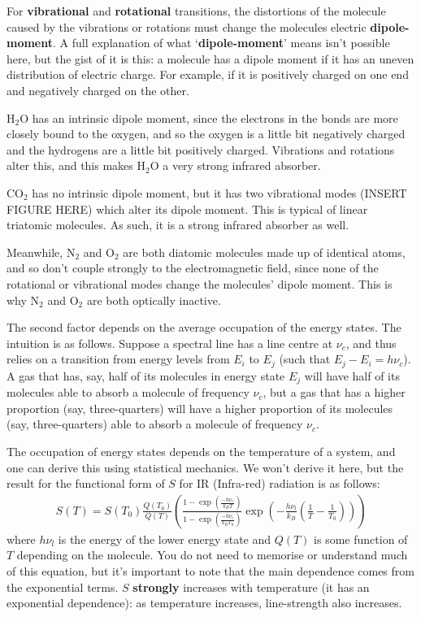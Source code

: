For \textbf{vibrational} and \textbf{rotational} transitions, the distortions of the molecule caused by the vibrations or rotations must change the molecules electric \textbf{dipole-moment}. A full explanation of what `\textbf{dipole-moment}' means isn't possible here, but the gist of it is this: a molecule has a dipole moment if it has an uneven distribution of electric charge. For example, if it is positively charged on one end and negatively charged on the other.

H$_2$O has an intrinsic dipole moment, since the electrons in the bonds are more closely bound to the oxygen, and so the oxygen is a little bit negatively charged and the hydrogens are a little bit positively charged. Vibrations and rotations alter this, and this makes H$_2$O a very strong infrared absorber.

CO$_2$ has no intrinsic dipole moment, but it has two vibrational modes (INSERT FIGURE HERE) which alter its dipole moment. This is typical of linear triatomic molecules. As such, it is a strong infrared absorber as well.

Meanwhile, N$_2$ and O$_2$ are both diatomic molecules made up of identical atoms, and so don't couple strongly to the electromagnetic field, since none of the rotational or vibrational modes change the molecules' dipole moment. This is why N$_2$ and O$_2$ are both optically inactive.

The second factor depends on the average occupation of the energy states. The intuition is as follows. Suppose a spectral line has a line centre at $\nu_c$, and thus relies on a transition from energy levels from $E_i$ to $E_j$ (such that $E_j-E_i=h\nu_c$). A gas that has, say, half of its molecules in energy state $E_j$ will have half of its molecules able to absorb a molecule of frequency $\nu_c$, but a gas that has a higher proportion (say, three-quarters) will have a higher proportion of its molecules (say, three-quarters) able to absorb a molecule of frequency $\nu_c$.

The occupation of energy states depends on the temperature of a system, and one can derive this using statistical mechanics. We won't derive it here, but the result for the functional form of $S$ for IR (Infra-red) radiation is as follows:
\begin{align*}
    S(T)=S(T_0)\frac{Q(T_0)}{Q(T)}\left( 
        \frac{1-\exp\left( \frac{-h\nu_c}{k_BT} \right)}{1-\exp\left( \frac{-h\nu_c}{k_BT_0} \right)}\exp\left( 
            -\frac{h\nu_l}{k_B}\left( \frac{1}{T}-\frac{1}{T_0} \right)
         \right)
     \right)
\end{align*}
where $h\nu_l$ is the energy of the lower energy state and $Q(T)$ is some function of $T$ depending on the molecule. You do not need to memorise or understand much of this equation, but it's important to note that the main dependence comes from the exponential terms. $S$ \textbf{strongly} increases with temperature (it has an exponential dependence): as temperature increases, line-strength also increases.

